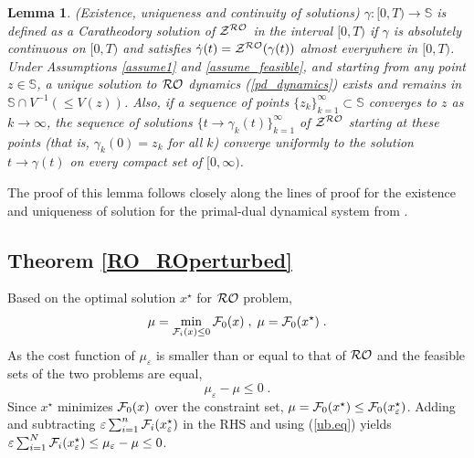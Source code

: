 \documentclass[journal,twoside,web]{ieeecolor}
\newtheorem{lemma}{Lemma}
\begin{document}
\begin{lemma} \label{uniq_exis}
(Existence, uniqueness and continuity of solutions)
$\gamma:[0,T) \rightarrow {\mathbb S}$ is defined as a Caratheodory solution of ${\cal Z}^{\cal RO}$ in the interval $[0,T)$ if $\gamma$ is absolutely continuous on $[0,T)$ and satisfies $\dot \gamma(t)={\cal Z}^{\cal RO} (\gamma(t))$ almost everywhere in $[0,T)$.
Under Assumptions \ref{assume1} and \ref{assume_feasible}, and starting from any point $z\in \mathbb S$, a unique solution to ${\cal RO}$ dynamics (\ref{pd_dynamics}) exists and remains in $\mathbb S \cap V^{-1}(\leq V(z))$. Also, if a sequence of points $\{z_k\}_{k=1}^\infty \subset {\mathbb S}$ converges to $z$ as $k \rightarrow \infty$, the sequence of solutions $\{t \rightarrow \gamma_k(t)\}_{k=1}^\infty$ of ${\cal Z}^{\cal RO}$ starting at these points (that is, $\gamma_k(0)=z_k$ for all $k$) converge uniformly to the solution $t \rightarrow \gamma(t)$ on every compact set of $[0,\infty)$.
\end{lemma}
The proof of this lemma follows closely along the lines of proof for the existence and uniqueness of solution for the primal-dual dynamical system from \cite[Lemma~4.3]{cherukuri2016}.

\subsection{Theorem \ref{RO_ROperturbed}}

Based on the optimal solution $x^\star$ for ${\cal RO}$ problem,
\begin{align*}
\mu=\min_{{\cal F}_i(x)\leq  0} {\cal F}_0(x)\;,\; \mu={\cal F}_0(x^\star)\;.
\end{align*}
As the cost function of $\mu_\varepsilon$ is smaller than or equal to that of ${\cal RO}$ and the feasible sets of the two problems are equal,
\begin{equation}\label{ub.eq}
 \mu_\varepsilon-\mu\leq 0\;.
\end{equation}
Since $x^\star$ minimizes ${\cal F}_0(x)$ over the constraint set, $\mu={\cal F}_0(x^\star)\leq {\cal F}_0(x_\varepsilon^\star)$.
Adding and subtracting $\varepsilon\sum_{i=1}^n{\cal F}_i(x^\star_\varepsilon)$
in the RHS and using (\ref{ub.eq}) yields $\varepsilon \sum_{i=1}^N{\cal F}_{i}(x_\varepsilon^\star)\leq
\mu_\varepsilon-\mu\leq 0$\;.
\end{document}
